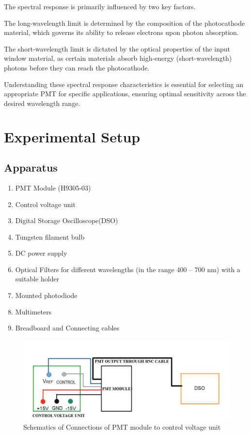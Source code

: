 The spectral response is primarily influenced by two key factors.

The long-wavelength limit is determined by the composition of the photocathode material, which governs its ability to release electrons upon photon absorption.

The short-wavelength limit is dictated by the optical properties of the input window material, as certain materials absorb high-energy (short-wavelength) photons before they can reach the photocathode.

Understanding these spectral response characteristics is essential for selecting an appropriate PMT for specific applications, ensuring optimal sensitivity across the desired wavelength range.

\section{Experimental Setup}

\subsection*{Apparatus}

\begin{enumerate}
    \item PMT Module (H9305-03)
    \item  Control voltage unit
    \item  Digital Storage Oscilloscope(DSO)
    \item  Tungsten filament bulb
    \item  DC power supply
    \item  Optical Filters for different wavelengths (in the
    range 400 – 700 nm) with a suitable holder
    \item  Mounted photodiode
    \item  Multimeters
    \item  Breadboard and Connecting cables
\end{enumerate}

\begin{figure}[H]
    \centering
    \includegraphics[width=1\columnwidth]{images/circ.png}
    \caption{Schematics of Connections of PMT module to control voltage unit}
    \label{g1}
\end{figure}